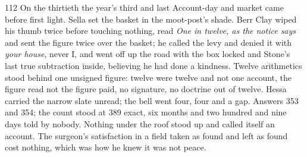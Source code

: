 \begin{CRchronicle}{112}
On the thirtieth the year’s third and last Account-day and market came before first light. Sella set the basket in the moot-post’s shade. Berr Clay wiped his thumb twice before touching nothing, read \emph{One in twelve, as the notice says} and sent the figure twice over the basket; he called the levy and denied it with \emph{your house}, never I, and went off up the road with the box locked and Stone’s last true subtraction inside, believing he had done a kindness. Twelve arithmetics stood behind one unsigned figure: twelve were twelve and not one account, the figure read not the figure paid, no signature, no doctrine out of twelve. Hessa carried the narrow slate unread; the bell went four, four and a gap. Answers 353 and 354; the count stood at 389 exact, six months and two hundred and nine days told by nobody. Nothing under the roof stood up and called itself an account. The surgeon’s satisfaction in a field taken as found and left as found cost nothing, which was how he knew it was not peace.
\end{CRchronicle}
